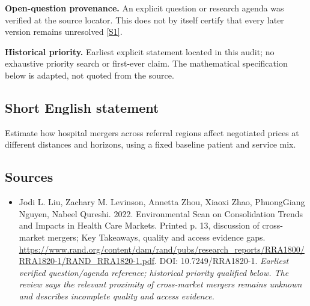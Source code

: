 \documentclass[11pt]{article}
\newcommand{\sref}[2]{\hyperlink{source:#1:#2}{[S#2]}}
\begin{document}
\par\textbf{Open-question provenance.} An explicit question or research agenda was verified at the source locator. This does not by itself certify that every later version remains unresolved \sref{30007722}{1}.

\par\textbf{Historical priority.} Earliest explicit statement located in this audit; no exhaustive priority search or first-ever claim. The mathematical specification below is adapted, not quoted from the source.

\subsection{Short English statement}
Estimate how hospital mergers across referral regions affect negotiated prices at different distances and horizons, using a fixed baseline patient and service mix.

\subsection{Sources}
\begin{itemize}\raggedright
\item[\textnormal{[S1]}]\hypertarget{source:30007722:1}{} Jodi L. Liu, Zachary M. Levinson, Annetta Zhou, Xiaoxi Zhao, PhuongGiang Nguyen, Nabeel Qureshi. 2022. Environmental Scan on Consolidation Trends and Impacts in Health Care Markets. Printed p. 13, discussion of cross-market mergers; Key Takeaways, quality and access evidence gaps.
\url{https://www.rand.org/content/dam/rand/pubs/research_reports/RRA1800/RRA1820-1/RAND_RRA1820-1.pdf}.
DOI: 10.7249/RRA1820-1.
{\small\textit{Earliest verified question/agenda reference; historical priority qualified below. The review says the relevant proximity of cross-market mergers remains unknown and describes incomplete quality and access evidence.}}
\end{itemize}
\end{document}
